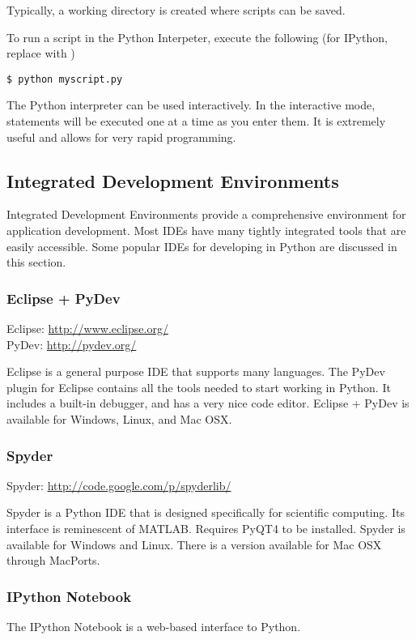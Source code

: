 Typically, a working directory is created where scripts can be saved.

To run a script in the Python Interpeter, execute the following (for IPython, replace  with )
\begin{verbatim}
$ python myscript.py
\end{verbatim}

The Python interpreter can be used interactively.  In the interactive mode, statements will be executed one at a time as you enter them.  It is extremely useful and allows for very rapid programming.

\subsection*{Integrated Development Environments}
Integrated Development Environments provide a comprehensive environment for application development.  Most IDEs have many tightly integrated tools that are easily accessible.  Some popular IDEs for developing in Python are discussed in this section.

\subsubsection*{Eclipse + PyDev}

Eclipse: \url{http://www.eclipse.org/} \\
PyDev: \url{http://pydev.org/}

Eclipse is a general purpose IDE that supports many languages.  The PyDev plugin for Eclipse contains all the tools needed to start working in Python.  It includes a built-in debugger, and has a very nice code editor.  Eclipse + PyDev is available for Windows, Linux, and Mac OSX.

\subsubsection*{Spyder}

Spyder: \url{http://code.google.com/p/spyderlib/}

Spyder is a Python IDE that is designed specifically for scientific computing.  Its interface is reminescent of MATLAB.  Requires PyQT4 to be installed.  Spyder is available for Windows and Linux.  There is a version available for Mac OSX through MacPorts.

\subsubsection*{IPython Notebook}
The IPython Notebook is a web-based interface to Python.

